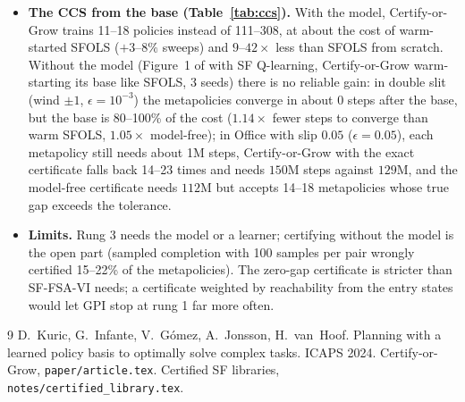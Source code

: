 \documentclass[11pt]{article}
\begin{document}
\begin{itemize}
of $0.58$M over all 20 tasks, $2.1\times$ fewer than learning from scratch (one learned base, 2 seeds: indicative).
\item \textbf{The CCS from the base (Table~\ref{tab:ccs}).} With the model, Certify-or-Grow trains 11--18 policies
instead of 111--308, at about the cost of warm-started SFOLS ($+3$--$8\%$ sweeps) and $9$--$42\times$ less than SFOLS
from scratch. Without the model (Figure~1 of \cite{cog} with SF Q-learning, Certify-or-Grow warm-starting its base
like SFOLS, 3 seeds) there is no reliable gain: in double slit (wind $\pm1$, $\epsilon=10^{-3}$) the metapolicies
converge in about 0 steps after the base, but the base is 80--100\% of the cost ($1.14\times$ fewer steps to converge
than warm SFOLS, $1.05\times$ model-free); in Office with slip $0.05$ ($\epsilon=0.05$), each metapolicy still needs about 1M steps,
Certify-or-Grow with the exact certificate falls back 14--23 times and needs $150$M steps against $129$M, and the
model-free certificate needs $112$M but accepts 14--18 metapolicies whose true gap exceeds the tolerance.
\item \textbf{Limits.} Rung 3 needs the model or a learner; certifying without the model is the open part (sampled
completion with 100 samples per pair wrongly certified 15--22\% of the metapolicies). The zero-gap certificate is
stricter than SF-FSA-VI needs; a certificate weighted by reachability from the entry states would let GPI stop at rung
1 far more often.
\end{itemize}

{\small
\begin{thebibliography}{9}\setlength\itemsep{0pt}
 D.~Kuric, G.~Infante, V.~G\'omez, A.~Jonsson, H.~van~Hoof. Planning with a learned policy basis to
optimally solve complex tasks. ICAPS 2024.
 Certify-or-Grow, \texttt{paper/article.tex}.
 Certified SF libraries, \texttt{notes/certified\_library.tex}.
\end{thebibliography}}
\end{document}
